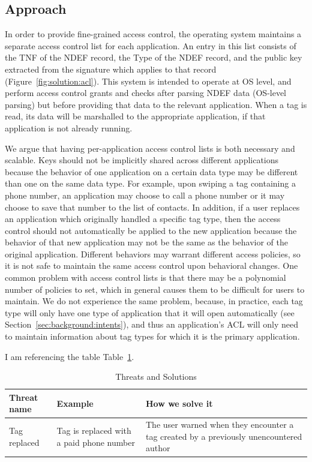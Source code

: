 \documentclass[12pt]{article}
\begin{document}
\subsection{Approach}
In order to provide fine-grained access control, the operating system maintains a separate access control list for each application.
An entry in this list consists of the TNF of the NDEF record, the Type of the NDEF record, and the public key extracted from the signature which applies to that record (Figure~\ref{fig:solution:acl}).
This system is intended to operate at OS level, and perform access control grants and checks after parsing NDEF data (OS-level parsing) but before providing that data to the relevant application.
When a tag is read, its data will be marshalled to the appropriate application, if that application is not already running.

We argue that having per-application access control lists is both necessary and scalable.
Keys should not be implicitly shared across different applications because the behavior of one application on a certain data type may be different than one on the same data type.
For example, upon swiping a tag containing a phone number, an application may choose to call a phone number or it may choose to save that number to the list of contacts.
In addition, if a user replaces an application which originally handled a specific tag type, then the access control should not automatically be applied to the new application because the behavior of that new application may not be the same as the behavior of the original application.
Different behaviors may warrant different access policies, so it is not safe to maintain the same access control upon behavioral changes.
One common problem with access control lists is that there may be a polynomial number of policies to set, which in general causes them to be difficult for users to maintain.
We do not experience the same problem, because, in practice, each tag type will only have one type of application that it will open automatically (see Section~\ref{sec:background:intents}), and thus an application's ACL will only need to maintain information about tag types for which it is the primary application.

I am referencing the table Table~\ref{tab:threats}.

\begin{table}
  \center
  \begin{tabular}{l | p{6cm} | p{6cm} }
  Threat name & Example & How we solve it \\
  \hline
  Tag replaced & Tag is replaced with a paid phone number & The user warned when they encounter a tag created by a previously unencountered author \\
  \end{tabular}
  \caption{Threats and Solutions}
  \label{tab:threats}
\end{table}
\end{document}
